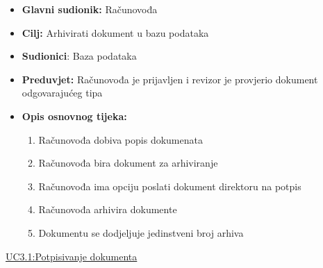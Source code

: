 \documentclass{article} %
\begin{document}
\begin{itemize}
	\item \textbf{Glavni sudionik:} Računovođa
	
	
	\item \textbf{Cilj:} Arhivirati dokument u bazu podataka
	
	
	\item \textbf{Sudionici}: Baza podataka
	
	
	\item \textbf{Preduvjet:} Računovođa je prijavljen i revizor je provjerio dokument odgovarajućeg tipa
	
	
	\item \textbf{Opis osnovnog tijeka:} 
	\begin{enumerate}
		\item Računovođa dobiva popis dokumenata
		
		
		\item Računovođa bira dokument za arhiviranje
		
		
		\item Računovođa ima opciju poslati dokument direktoru na potpis
		
		\item Računovođa arhivira dokumente
		
		\item Dokumentu se dodjeljuje jedinstveni broj arhiva
		
	\end{enumerate}
\end{itemize}


\noindent\underline{UC3.1:Potpisivanje dokumenta}
\end{document}
